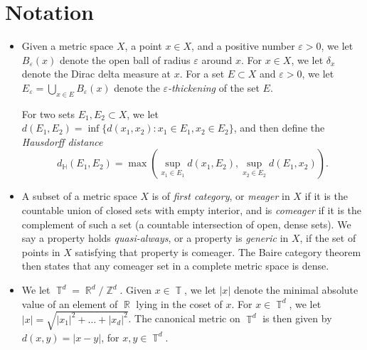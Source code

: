 \documentclass[dvipsnames,letterpaper,12pt]{article}
\numberwithin{equation}{section}
\DeclareMathOperator{\RR}{\mathbb{R}}
\DeclareMathOperator{\ZZ}{\mathbb{Z}}
\DeclareMathOperator{\TT}{\mathbb{T}}
\newtheorem{theorem}{Theorem}
\numberwithin{theorem}{section}
\begin{document}

\section{Notation} \label{notationSection}

\begin{itemize}

    \item Given a metric space $X$, a point $x \in X$, and a positive number $\varepsilon > 0$, we let $B_\varepsilon(x)$ denote the open ball of radius $\varepsilon$ around $x$. For $x \in X$, we let $\delta_x$ denote the Dirac delta measure at $x$. For a set $E \subset X$ and $\varepsilon > 0$, we let $E_\varepsilon = \bigcup_{x \in E} B_\varepsilon(x)$ denote the \emph{$\varepsilon$-thickening} of the set $E$.

    For two sets $E_1,E_2 \subset X$, we let $d(E_1,E_2) = \inf \{ d(x_1,x_2) : x_1 \in E_1, x_2 \in E_2 \}$, and then define the \emph{Hausdorff distance}
    \[ d_{\mathbb{H}}(E_1,E_2) = \max \left( \sup_{x_1 \in E_1} d(x_1,E_2), \sup_{x_2 \in E_2} d(E_1,x_2) \right). \]

    \item A subset of a metric space $X$ is of \emph{first category}, or \emph{meager} in $X$ if it is the countable union of closed sets with empty interior, and is \emph{comeager} if it is the complement of such a set (a countable intersection of open, dense sets). We say a property holds \emph{quasi-always}, or a property is \emph{generic} in $X$, if the set of points in $X$ satisfying that property is comeager. The Baire category theorem then states that any comeager set in a complete metric space is dense.

    \item We let $\TT^d = \RR^d/\ZZ^d$. Given $x \in \TT$, we let $|x|$ denote the minimal absolute value of an element of $\RR$ lying in the coset of $x$. For $x \in \TT^d$, we let $|x| = \sqrt{|x_1|^2 + \dots + |x_d|^2}$. The canonical metric on $\TT^d$ is then given by $d(x,y) = |x - y|$, for $x,y \in \TT^d$.


\end{itemize}
\end{document}
